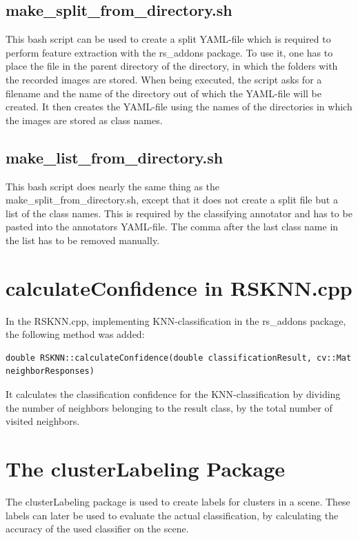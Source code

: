 \documentclass[main.tex]{subfiles}
\begin{document}
\subsection{make\_split\_from\_directory.sh} 
This bash script can be used to create a split YAML-file which is required to perform feature extraction with the rs\_addons package. To use it, one has to place the file in the parent directory of the directory, in which the folders with the recorded images are stored. When being executed, the script asks for a filename and the name of the directory out of which the YAML-file will be created. It then creates the YAML-file using the names of the directories in which the images are stored as class names.

\subsection{make\_list\_from\_directory.sh}
This bash script does nearly the same thing as the make\_split\_from\_directory.sh, except that it does not create a split file but a list of the class names. This is required by the classifying annotator and has to be pasted into the annotators YAML-file. The comma after the last class name in the list has to be removed manually.

\section{calculateConfidence in RSKNN.cpp}
In the RSKNN.cpp, implementing KNN-classification in the rs\_addons package, the following method was added:

\begin{lstlisting}
double RSKNN::calculateConfidence(double classificationResult, cv::Mat neighborResponses)
\end{lstlisting}

It calculates the classification confidence for the KNN-classification by dividing the number of neighbors belonging to the result class, by the total number of visited neighbors. 

\section{The clusterLabeling Package}
The clusterLabeling package is used to create labels for clusters in a scene. These labels can later be used to evaluate the actual classification, by calculating the accuracy of the used classifier on the scene.
\end{document}
